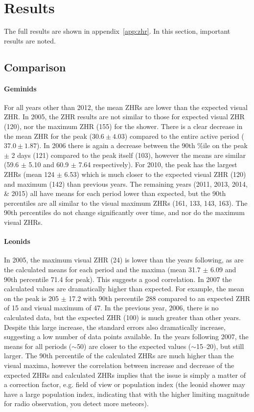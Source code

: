 \section{Results}
The full results are shown in appendix~\ref{app:zhr}. In this section, important results are noted.
\subsection{Comparison}
\paragraph{Geminids\\}
For all years other than 2012, the mean ZHRs are lower than the expected visual ZHR. 
In 2005, the ZHR results are not similar to those for expected visual ZHR (120), nor the maximum ZHR (155) for the shower. There is a clear decrease in the mean ZHR for the peak ($30.6 \pm 4.03$) compared to the entire active period ($37.0 \pm 1.87$). In 2006 there is again a decrease between the 90th \%ile on the peak $\pm$ 2 days (121) compared to the peak itself (103), however the means are similar (59.6 $\pm$ 5.10 and 60.9 $\pm$ 7.64 respectively).
For 2010, the peak has the largest ZHRs (mean 124 $\pm$ 6.53) which is much closer to the expected visual ZHR (120) and maximum (142) than previous years.
The remaining years (2011, 2013, 2014, \& 2015) all have means for each period lower than expected, but the 90th percentiles are all similar to the visual maximum ZHRs (161, 133, 143, 163).
The 90th percentiles do not change significantly over time, and nor do the maximum visual ZHRs.

\paragraph{Leonids\\}
In 2005, the maximum visual ZHR (24) is lower than the years following, as are the calculated means for each period and the maxima (mean 31.7 $\pm$ 6.09 and 90th percentile 71.4 for peak). This suggests a good correlation. 
In 2007 the calculated values are dramatically higher than expected. For example, the mean on the peak is 205 $\pm$ 17.2 with 90th percentile 288 compared to an expected ZHR of 15 and visual maximum of 47. In the previous year, 2006, there is no calculated data, but the expected ZHR (100) is much greater than other years. Despite this large increase, the standard errors also dramatically increase, suggesting a low number of data points available. 
In the years following 2007, the means for all periods ($\sim$50) are closer to the expected values ($\sim$15--20), but still larger. The 90th percentile of the calculated ZHRs are much higher than the visual maxima, however the correlation between increase and decrease of the expected ZHRs and calculated ZHRs implies that the issue is simply a matter of a correction factor, e.g. field of view or population index (the leonid shower may have a large population index, indicating that with the higher limiting magnitude for radio observation, you detect more meteors).

